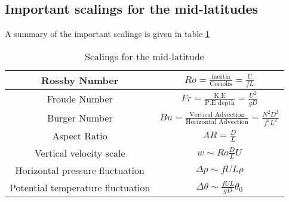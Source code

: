 \subsection{Important scalings for the mid-latitudes} 
A summary of the important scalings is given in table \ref{scalingstable}
\begin{table}[H]
    \centering
    \begin{tabular}{|c|c|}
        \hline
         Rossby Number & $\displaystyle Ro=\frac{\text{inertia}}{\text{Coriolis}}=\frac{U}{fL}$ \\[0.5cm] \hline
         Froude Number & $\displaystyle Fr=\frac{\text{K.E}}{\text{P.E depth}}=\frac{U^2}{gD}$ \\[0.5cm] \hline
         Burger Number & $\displaystyle Bu=\frac{\text{Vertical Advection}}{\text{Horizontal Advection}}=\frac{N^2D^2}{f^2L^2}$\\[0.5cm] \hline
         Aspect Ratio & $\displaystyle AR=\frac{D}{L}$\\[0.5cm] \hline
         Vertical velocity scale & $\displaystyle w\sim Ro\frac{D}{L}U$\\[0.5cm]\hline 
         Horizontal pressure fluctuation & $\displaystyle \Delta p \sim fUL\rho$\\[0.5cm]\hline
         Potential temperature fluctuation & $\displaystyle\Delta\theta\sim\frac{fUL}{gD}\theta_0$ \\
         \hline
    \end{tabular}
    \caption{Scalings for the mid-latitude}
    \label{scalingstable}
\end{table}

